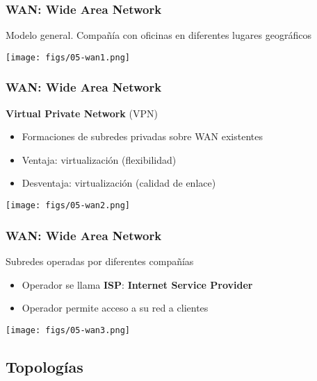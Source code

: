 \documentclass[letter]{beamer}
\begin{document}
\begin{frame}
  \frametitle{WAN: Wide Area Network}

  Modelo general. Compañía con oficinas en diferentes lugares geográficos
  \begin{center}
    \texttt{[image: figs/05-wan1.png]}
  \end{center}

\end{frame}

\begin{frame}
  \frametitle{WAN: Wide Area Network}

  {\bf Virtual Private Network} (VPN)
  \begin{itemize}
    \item Formaciones de subredes privadas sobre WAN existentes
    \item Ventaja: virtualización (flexibilidad)
    \item Desventaja: virtualización (calidad de enlace)
  \end{itemize}

  \begin{center}
    \texttt{[image: figs/05-wan2.png]}
  \end{center}

\end{frame}

\begin{frame}
  \frametitle{WAN: Wide Area Network}
  
  Subredes operadas por diferentes compañías
  \begin{itemize}
    \item Operador se llama {\bf ISP}: {\bf Internet Service Provider}
    \item Operador permite acceso a su red a clientes
  \end{itemize}
  
  \begin{center}
    \texttt{[image: figs/05-wan3.png]}
  \end{center}

\end{frame}

\subsection{Topologías}
\end{document}
